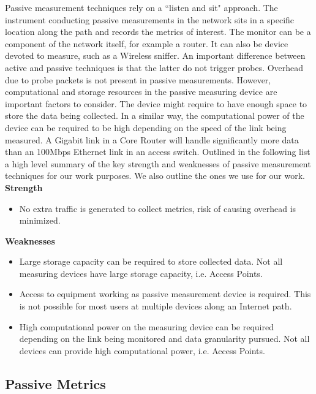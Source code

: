 Passive measurement techniques rely on a ``listen and sit" approach. The instrument conducting passive measurements in the network sits in a specific location along the path and records the metrics of interest. The monitor can be a component of the network itself, for example a router. It can also be device devoted to measure, such as a Wireless sniffer. An important difference between active and passive techniques is that the latter do not trigger probes. Overhead due to probe packets is not present in passive measurements. However, computational and storage resources in the passive measuring device are important factors to consider. The device might require to have enough space to store the data being collected. In a similar way, the computational power of the device can be required to be high depending on the speed of the link being measured. A Gigabit link in a Core Router will handle significantly more data than an 100Mbps Ethernet link in an access switch. 
Outlined in the following list a high level summary of the key strength and weaknesses of passive measurement techniques for our work purposes. We also outline the ones we use for our work.
\\

\textbf{Strength}
\begin{itemize}
	\item No extra traffic is generated to collect metrics, risk of causing overhead is minimized.
\end{itemize}


\textbf{Weaknesses}
\begin{itemize}
	\item Large storage capacity can be required to store collected data. Not all measuring devices have large storage capacity, i.e. Access Points.
	\item Access to equipment working as passive measurement device is required. This is not possible for most users at multiple devices along an Internet path.
	\item High computational power on the measuring device can be required depending on the link being monitored and data granularity pursued. Not all devices can provide high computational power, i.e. Access Points.
\end{itemize}

\subsection*{Passive Metrics}

